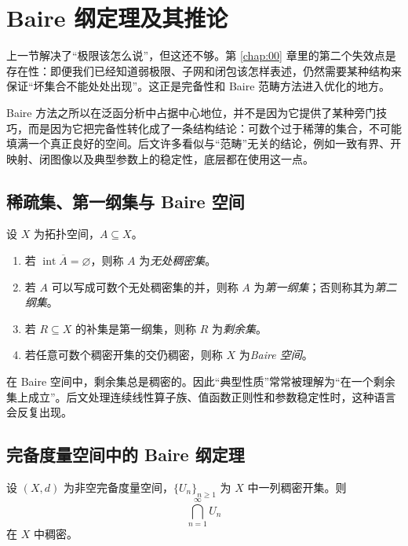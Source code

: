 \section{Baire 纲定理及其推论}

\label{sec:1-2}

上一节解决了“极限该怎么说”，但这还不够。第 \ref{chap:00} 章里的第二个失效点是存在性：即便我们已经知道弱极限、子网和闭包该怎样表述，仍然需要某种结构来保证“坏集合不能处处出现”。这正是完备性和 Baire 范畴方法进入优化的地方。

Baire 方法之所以在泛函分析中占据中心地位，并不是因为它提供了某种旁门技巧，而是因为它把完备性转化成了一条结构结论：可数个过于稀薄的集合，不可能填满一个真正良好的空间。后文许多看似与“范畴”无关的结论，例如一致有界、开映射、闭图像以及典型参数上的稳定性，底层都在使用这一点。

\subsection{稀疏集、第一纲集与 Baire 空间}

\begin{definition}\label{def:baire-space}
设 $X$ 为拓扑空间，$A\subseteq X$。
\begin{enumerate}
  \item 若 $\operatorname{int}\overline{A}=\varnothing$，则称 $A$ 为\emph{无处稠密集}。
  \item 若 $A$ 可以写成可数个无处稠密集的并，则称 $A$ 为\emph{第一纲集}；否则称其为\emph{第二纲集}。
  \item 若 $R\subseteq X$ 的补集是第一纲集，则称 $R$ 为\emph{剩余集}。
  \item 若任意可数个稠密开集的交仍稠密，则称 $X$ 为\emph{Baire 空间}。
\end{enumerate}
\end{definition}

在 Baire 空间中，剩余集总是稠密的。因此“典型性质”常常被理解为“在一个剩余集上成立”。后文处理连续线性算子族、值函数正则性和参数稳定性时，这种语言会反复出现。

\subsection{完备度量空间中的 Baire 纲定理}

\begin{theorem}\label{thm:baire-complete}
设 $(X,d)$ 为非空完备度量空间，$\{U_n\}_{n\ge 1}$ 为 $X$ 中一列稠密开集。则
\[
\bigcap_{n=1}^{\infty} U_n
\]
在 $X$ 中稠密。
\end{theorem}

